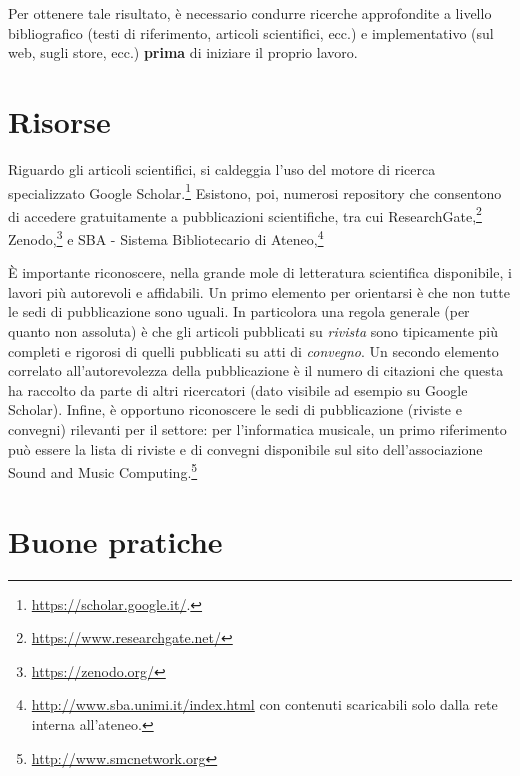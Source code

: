 \documentclass[12pt]{report}
\begin{document}
Per ottenere tale risultato, è necessario condurre ricerche approfondite a livello bibliografico (testi di riferimento, articoli scientifici, ecc.) e implementativo (sul web, sugli store, ecc.) \textbf{prima} di iniziare il proprio lavoro.

\section{Risorse}

Riguardo gli articoli scientifici, si caldeggia l'uso del motore di ricerca specializzato Google Scholar.\footnote{\url{https://scholar.google.it/}.} Esistono, poi, numerosi repository che consentono di accedere gratuitamente a pubblicazioni scientifiche, tra cui ResearchGate,\footnote{\url{https://www.researchgate.net/}} Zenodo,\footnote{\url{https://zenodo.org/}} e SBA - Sistema Bibliotecario di Ateneo,\footnote{\url{http://www.sba.unimi.it/index.html} con contenuti scaricabili solo dalla rete interna all'ateneo.}

\`E importante riconoscere, nella grande mole di letteratura scientifica disponibile, i lavori pi\`u autorevoli e affidabili. Un primo elemento per orientarsi \`e che non tutte le sedi di pubblicazione sono uguali. In particolora una regola generale (per quanto non assoluta) \`e che gli articoli pubblicati su {\em rivista} sono tipicamente pi\`u completi e rigorosi di quelli pubblicati su atti di {\em convegno}. Un secondo elemento correlato all'autorevolezza della pubblicazione \`e il numero di citazioni che questa ha raccolto da parte di altri ricercatori (dato visibile ad esempio su Google Scholar). Infine, \`e opportuno riconoscere le sedi di pubblicazione (riviste e convegni) rilevanti per il settore: per l'informatica musicale, un primo riferimento pu\`o essere la lista di riviste e di convegni disponibile sul sito dell'associazione Sound and Music Computing.\footnote{\url{http://www.smcnetwork.org}}

\section{Buone pratiche}
\end{document}
